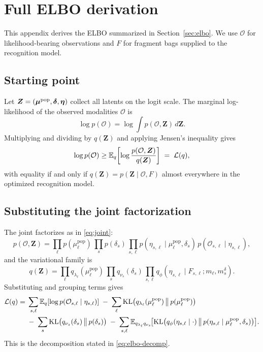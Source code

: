 \section{Full ELBO derivation}
\label{app:elbo}

This appendix derives the ELBO summarized in Section~\ref{sec:elbo}. We use $\mathcal{O}$ for likelihood-bearing observations and $F$ for fragment bags supplied to the recognition model.

\subsection*{Starting point}
Let $\bm Z=(\bm\mu^{\mathrm{pop}},\boldsymbol{\delta},\bm\eta)$ collect all latents on the logit scale. The marginal log-likelihood of the observed modalities $\mathcal{O}$ is
\begin{equation}
\log p(\mathcal{O}) = \log \int p(\mathcal{O},\bm Z)\,d\bm Z.
\end{equation}
Multiplying and dividing by $q(\bm Z)$ and applying Jensen's inequality gives
\begin{equation}
\log p(\mathcal{O}) \ge \mathbb{E}_q\!\left[\log\frac{p(\mathcal{O},\bm Z)}{q(\bm Z)}\right] \;=\; \mathcal{L}(q),
\label{eq:appA-elbo-def}
\end{equation}
with equality if and only if $q(\bm Z)=p(\bm Z\mid \mathcal{O},F)$ almost everywhere in the optimized recognition model.

\subsection*{Substituting the joint factorization}
The joint factorizes as in \eqref{eq:joint}:
\begin{equation}
p(\mathcal{O},\bm Z) = \prod_\ell p(\mu^{\mathrm{pop}}_\ell)\,\prod_s p(\delta_s)\,\prod_{s,\ell} p(\eta_{s,\ell}\mid \mu^{\mathrm{pop}}_\ell,\delta_s)\,p(\mathcal{O}_{s,\ell}\mid\eta_{s,\ell}),
\end{equation}
and the variational family is
\begin{equation}
q(\bm Z) = \prod_\ell q_{\lambda_\ell}(\mu^{\mathrm{pop}}_\ell)\,\prod_s q_{\nu_s}(\delta_s)\,\prod_{s,\ell} q_\phi(\eta_{s,\ell}\mid F_{s,\ell};m_\ell,m_s^\delta).
\end{equation}
Substituting and grouping terms gives
\begin{align}
\mathcal{L}(q) =\;& \sum_{s,\ell}\mathbb{E}_q[\log p(\mathcal{O}_{s,\ell}\mid \eta_{s,\ell})]
\;-\;\sum_\ell \mathrm{KL}\big(q_{\lambda_\ell}(\mu^{\mathrm{pop}}_\ell)\,\big\|\,p(\mu^{\mathrm{pop}}_\ell)\big) \nonumber\\
&-\;\sum_s \mathrm{KL}\big(q_{\nu_s}(\delta_s)\,\big\|\,p(\delta_s)\big)
\;-\;\sum_{s,\ell}\mathbb{E}_{q_{\lambda_\ell} q_{\nu_s}}\!\big[\mathrm{KL}\big(q_\phi(\eta_{s,\ell}\mid \cdot)\,\big\|\,p(\eta_{s,\ell}\mid\mu^{\mathrm{pop}}_\ell,\delta_s)\big)\big].
\label{eq:appA-decomp}
\end{align}
This is the decomposition stated in \eqref{eq:elbo-decomp}.

